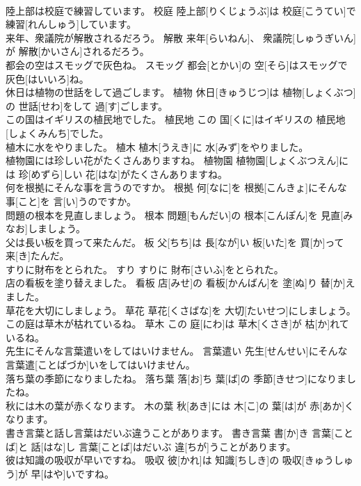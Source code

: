 \documentclass[8pt]{extreport}
\begin{document}
\begin{CJK}{UTF8}{min}
\\	陸上部は校庭で練習しています。	校庭	陸上部[りくじょうぶ]は 校庭[こうてい]で 練習[れんしゅう]しています。	
\\	来年、衆議院が解散されるだろう。	解散	来年[らいねん]、 衆議院[しゅうぎいん]が 解散[かいさん]されるだろう。	
\\	都会の空はスモッグで灰色ね。	スモッグ	都会[とかい]の 空[そら]はスモッグで 灰色[はいいろ]ね。	
\\	休日は植物の世話をして過ごします。	植物	休日[きゅうじつ]は 植物[しょくぶつ]の 世話[せわ]をして 過[す]ごします。	
\\	この国はイギリスの植民地でした。	植民地	この 国[くに]はイギリスの 植民地[しょくみんち]でした。	
\\	植木に水をやりました。	植木	植木[うえき]に 水[みず]をやりました。	
\\	植物園には珍しい花がたくさんありますね。	植物園	植物園[しょくぶつえん]には 珍[めずら]しい 花[はな]がたくさんありますね。	
\\	何を根拠にそんな事を言うのですか。	根拠	何[なに]を 根拠[こんきょ]にそんな 事[こと]を 言[い]うのですか。	
\\	問題の根本を見直しましょう。	根本	問題[もんだい]の 根本[こんぽん]を 見直[みなお]しましょう。	
\\	父は長い板を買って来たんだ。	板	父[ちち]は 長[なが]い 板[いた]を 買[か]って 来[き]たんだ。	
\\	すりに財布をとられた。	すり	すりに 財布[さいふ]をとられた。	
\\	店の看板を塗り替えました。	看板	店[みせ]の 看板[かんばん]を 塗[ぬ]り 替[か]えました。	
\\	草花を大切にしましょう。	草花	草花[くさばな]を 大切[たいせつ]にしましょう。	
\\	この庭は草木が枯れているね。	草木	この 庭[にわ]は 草木[くさき]が 枯[か]れているね。	
\\	先生にそんな言葉遣いをしてはいけません。	言葉遣い	先生[せんせい]にそんな 言葉遣[ことばづか]いをしてはいけません。	
\\	落ち葉の季節になりましたね。	落ち葉	落[お]ち 葉[ば]の 季節[きせつ]になりましたね。	
\\	秋には木の葉が赤くなります。	木の葉	秋[あき]には 木[こ]の 葉[は]が 赤[あか]くなります。	
\\	書き言葉と話し言葉はだいぶ違うことがあります。	書き言葉	書[か]き 言葉[ことば]と 話[はな]し 言葉[ことば]はだいぶ 違[ちが]うことがあります。	
\\	彼は知識の吸収が早いですね。	吸収	彼[かれ]は 知識[ちしき]の 吸収[きゅうしゅう]が 早[はや]いですね。	

\end{CJK}
\end{document}
